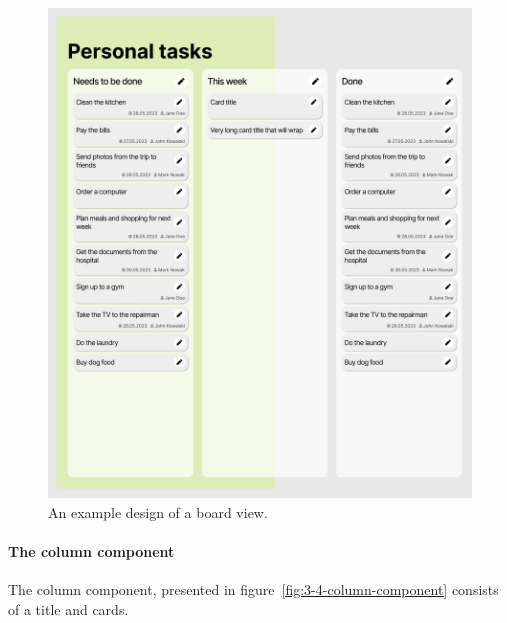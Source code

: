\begin{figure}
    \centering
    \includegraphics[height=0.4\textheight]{./3-research-methodology/board-view}
    \caption{An example design of a board view.}
    \label{fig:3-4-board-view}
\end{figure}

\paragraph{The column component}
The column component, presented in figure~\ref{fig:3-4-column-component} consists of a title and cards.

